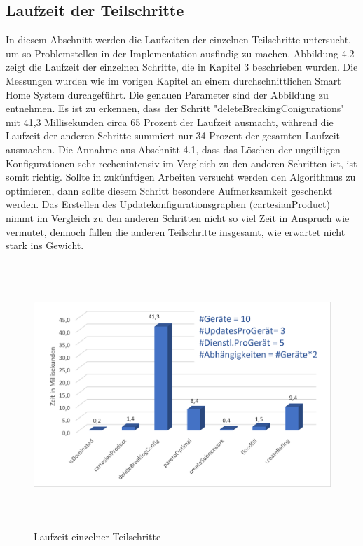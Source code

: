 \subsection{Laufzeit der Teilschritte}
In diesem Abschnitt werden die Laufzeiten der einzelnen Teilschritte untersucht, um so Problemstellen in der Implementation ausfindig zu machen. Abbildung 4.2 zeigt die
Laufzeit der einzelnen Schritte, die in Kapitel 3 beschrieben wurden. Die Messungen wurden wie im vorigen Kapitel an einem durchschnittlichen Smart Home System durchgeführt.
Die genauen Parameter sind der Abbildung zu entnehmen.
Es ist zu erkennen, dass der Schritt "deleteBreakingConigurations" mit 41,3 Millisekunden circa 65 Prozent der Laufzeit ausmacht, während die Laufzeit der anderen Schritte summiert
nur 34 Prozent der gesamten Laufzeit ausmachen. Die Annahme aus Abschnitt 4.1, dass das Löschen der ungültigen Konfigurationen sehr rechenintensiv im Vergleich zu den
anderen Schritten ist, ist somit richtig. Sollte in zukünftigen Arbeiten versucht werden den Algorithmus zu optimieren, dann sollte diesem Schritt besondere Aufmerksamkeit geschenkt
werden.  Das Erstellen des Updatekonfigurationsgraphen (cartesianProduct) nimmt im Vergleich zu den anderen Schritten nicht so viel Zeit in Anspruch wie vermutet, dennoch
fallen die anderen Teilschritte insgesamt, wie erwartet nicht stark ins Gewicht.

\begin{figure}[h]
\begin{center}
\includegraphics[width=14cm,height=10cm]{"images/Teilschritte"}
\caption{Laufzeit einzelner Teilschritte}
\label{fig:Prob1:MEA}
\end{center}
\end{figure}

